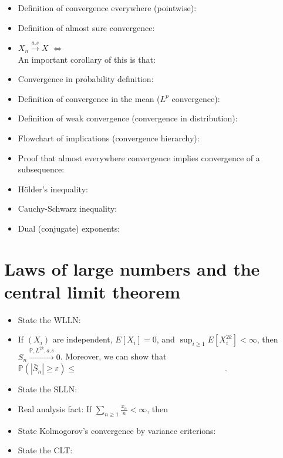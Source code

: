 \documentclass[12pt,reqno]{article}
\theoremstyle{plain}
\theoremstyle{definition}
\newcommand{\PP}[1]{\ensuremath{\mathbb{P}\left(#1\right)}}
\begin{document}
\begin{itemize} 

\item Definition of convergence everywhere (pointwise): \\ 
\item Definition of almost sure convergence: \\ 
\item $X_n \xrightarrow{a.s} X$ $\iff$ \\ 
      An important corollary of this is that: \\ 
\item Convergence in probability definition: \\ 
\item Definition of convergence in the mean ($L^p$ convergence): \\ 
\item Definition of weak convergence (convergence in distribution): \\ 
\item Flowchart of implications (convergence hierarchy): \\ \vspace{1.5in} 
\item Proof that almost everywhere convergence implies convergence of a subsequence: \\ 
\item H\"older's inequality: \\ 
\item Cauchy-Schwarz inequality: \\ 
\item Dual (conjugate) exponents: \\ 

\end{itemize} 

\section{Laws of large numbers and the central limit theorem} 

\begin{itemize} 

\item State the WLLN: \\ 
\item If $(X_i)$ are independent, $E[X_i] = 0$, and $\sup_{i \geq 1} E[X_i^{2k}] < \infty$, then 
      $S_n \xrightarrow{\mathbb{P},L^{2k}, a.s} 0$. Moreover, we can show that \\ 
      $\PP{|\bar{S}_n| \geq \varepsilon} \leq \hspace{3in}$. 
\item State the SLLN: \\ 
\item Real analysis fact: If $\sum_{n \geq 1} \frac{x_n}{n} < \infty$, then 
\item State Kolmogorov's convergence by variance criterions: \\ 
\item State the CLT: \\ 

\end{itemize} 
\end{document}

